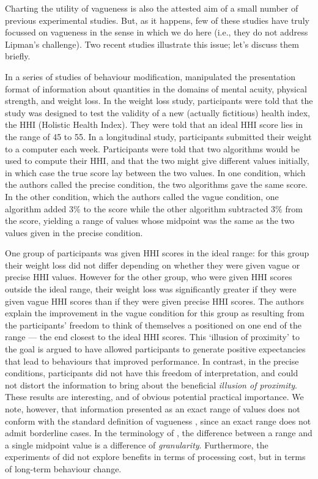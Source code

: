 \documentclass[ %
  graybox       %
 ,envcountchap  %
 ,sectrefs      %
]{svmono}
\begin{document}
Charting the utility of vagueness is also the attested aim of a small number of previous experimental studies. But, as it happens, few of these studies have truly focussed on vagueness in the sense in which we do here (i.e., they do not address Lipman's challenge). Two recent studies illustrate this issue; let's discuss them briefly.

In a series of studies of behaviour modification, \citet{Mishra01042011} manipulated the presentation format of information about quantities in the domains of mental acuity, physical strength, and weight loss. In the weight loss study, participants were told that the study was designed to test the validity of a new (actually fictitious) health index, the HHI (Holistic Health Index). They were told that an ideal HHI score lies in the range of 45 to 55. In a longitudinal study, participants submitted their weight to a computer each week. Participants were told that two algorithms would be used to compute their HHI, and that the two might give different values initially, in which case the true score lay between the two values. In one condition, which the authors called the precise condition, the two algorithms gave the same score. In the other condition, which the authors called the vague condition, one algorithm added 3\% to the score while the other algorithm subtracted 3\% from the score, yielding a range of values whose midpoint was the same as the two values given in the precise condition.

One group of participants was given HHI scores in the ideal range: for this group their weight loss did not differ depending on whether they were given vague or precise HHI values. However for the other group, who were given HHI scores outside the ideal range, their weight loss was significantly greater if they were given vague HHI scores than if they were given precise HHI scores. The authors explain the improvement in the vague condition for this group as resulting from the participants' freedom to think of themselves a positioned on one end of the range --- the end closest to the ideal HHI scores. This `illusion of proximity' \citep[][p.~4]{Mishra01042011} to the goal is argued to have allowed participants to generate positive expectancies that lead to behaviours that improved performance. In contrast, in the precise conditions, participants did not have this freedom of interpretation, and could not distort the information to bring about the beneficial \emph{illusion of proximity}. These results are interesting, and of obvious potential practical importance. We note, however, that information presented as an exact range of values does not conform with the standard definition of vagueness \citep{keefe1997vagueness, EgreKlinedinst}, since an exact range does not admit borderline cases. In the terminology of \citeauthor{Hobbs85granularity}, the difference between a range and a single midpoint value is a difference of \emph{granularity}. Furthermore, the experiments of \citeauthor{Mishra01042011} did not explore benefits in terms of processing cost, but in terms of long-term behaviour change.
\end{document}
